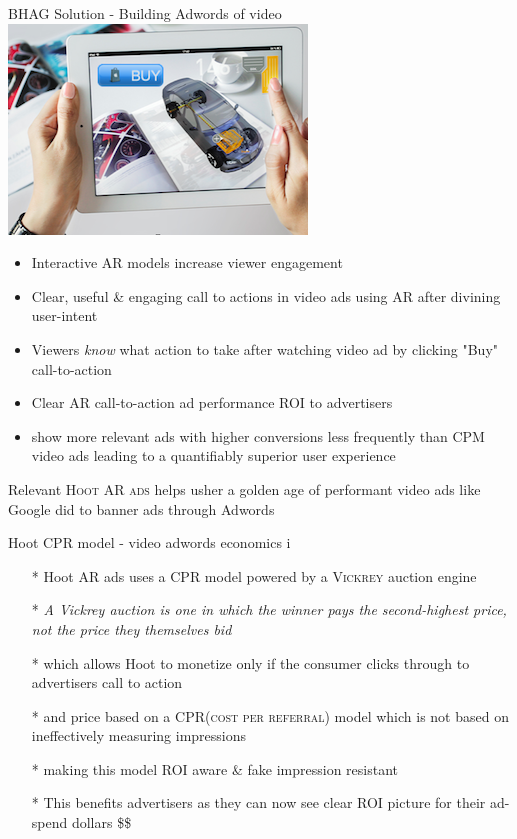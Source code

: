 \documentclass[11pt,handout]{beamer}
\begin{document}
\begin{frame}[fragile]{BHAG Solution - Building Adwords of video \includegraphics[scale=.1]{static/arad/arad5} }
\begin{itemize}[<+-| alert@+>]
\item Interactive AR models increase viewer engagement
\item Clear, useful \& engaging call to actions in video ads using AR after divining user-intent
\item Viewers \emph{know} what action to take after watching video ad by clicking "Buy" call-to-action
\item Clear AR call-to-action ad performance \textsc{ROI} to advertisers 
\item show more relevant ads with higher conversions less frequently than CPM video ads leading to a quantifiably superior user experience 
\end{itemize}
\pause
Relevant \textsc{Hoot AR ads} helps usher a golden age of performant video ads like Google did to banner ads through Adwords


\end{frame}

\begin{frame}[t]{Hoot CPR model - video adwords economics i}
\begin{itemize}[<+-| alert@+>]
\item[*] Hoot AR ads uses a CPR model powered by a \textsc{Vickrey} auction engine
\item[*]\emph{A Vickrey auction is one in which the winner pays the second-highest price, not the price they themselves bid}
\item[*]which allows Hoot to monetize only if the consumer clicks through to advertisers call to action
\item[*]and price based on a \textsc{CPR(cost per referral)} model which is not based on ineffectively measuring impressions
\item[*]making this model ROI aware \& fake impression resistant
\item[*]This benefits advertisers as they can now see clear ROI picture for their ad-spend dollars \$\$ 
\end{itemize}
\end{frame}
\end{document}
